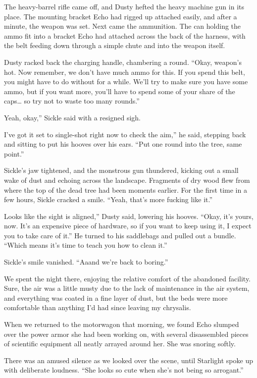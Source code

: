 The heavy-barrel rifle came off, and Dusty hefted the heavy machine gun in its place. The mounting bracket Echo had rigged up attached easily, and after a minute, the weapon was set. Next came the ammunition. The can holding the ammo fit into a bracket Echo had attached across the back of the harness, with the belt feeding down through a simple chute and into the weapon itself.

Dusty racked back the charging handle, chambering a round. “Okay, weapon’s hot. Now remember, we don’t have much ammo for this. If you spend this belt, you might have to do without for a while. We’ll try to make sure you have some ammo, but if you want more, you’ll have to spend some of your share of the caps… so try not to waste too many rounds.”

\leavevmode{}Yeah, okay,” Sickle said with a resigned sigh.

\leavevmode{}I’ve got it set to single-shot right now to check the aim,” he said, stepping back and sitting to put his hooves over his ears. “Put one round into the tree, same point.”

Sickle’s jaw tightened, and the monstrous gun thundered, kicking out a small wake of dust and echoing across the landscape. Fragments of dry wood flew from where the top of the dead tree had been moments earlier. For the first time in a few hours, Sickle cracked a smile. “Yeah, that’s more fucking like it.”

\leavevmode{}Looks like the sight is aligned,” Dusty said, lowering his hooves. “Okay, it’s yours, now. It’s an expensive piece of hardware, so if you want to keep using it, I expect you to take care of it.” He turned to his saddlebags and pulled out a bundle. “Which means it’s time to teach you how to clean it.”

Sickle’s smile vanished. “Aaand we’re back to boring.”

{\br}%
We spent the night there, enjoying the relative comfort of the abandoned facility. Sure, the air was a little musty due to the lack of maintenance in the air system, and everything was coated in a fine layer of dust, but the beds were more comfortable than anything I’d had since leaving my chrysalis.

When we returned to the motorwagon that morning, we found Echo slumped over the power armor she had been working on, with several disassembled pieces of scientific equipment all neatly arrayed around her. She was snoring softly.

There was an amused silence as we looked over the scene, until Starlight spoke up with deliberate loudness. “She looks so cute when she’s not being so arrogant.”

